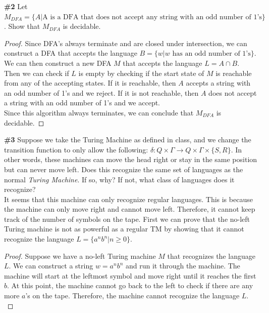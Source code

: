 \documentclass{article}
\newcommand{\problem}[1]{\textbf{\##1}}
\newcommand{\prob}[1]{\problem{#1}}
\begin{document}
\pagebreak

\prob{2} Let $M_{DFA} = \{A | \text{A is a DFA that does not accept any string with an odd number of 1's}\}$. Show that $M_{DFA}$ is decidable.

\begin{proof}
    Since DFA's always terminate and are closed under intersection, we can construct a DFA that accepts the language $B = \{w | w \text{ has an odd number of 1's}\}$. We can then construct a new DFA $M$ that accepts the language $L = A \cap B$.\\

    Then we can check if $L$ is empty by checking if the start state of $M$ is reachable from any of the accepting states. If it is reachable, then $A$ accepts a string with an odd number of 1's and we reject. If it is not reachable, then $A$ does not accept a string with an odd number of 1's and we accept.\\

    Since this algorithm always terminates, we can conclude that $M_{DFA}$ is decidable.
\end{proof}

\pagebreak

\prob{3} Suppose we take the Turing Machine as defined in class, and we change the transition function to only allow the following: $\delta : Q \times \Gamma \rightarrow Q \times \Gamma \times \{S,R\}$. In other words, these machines can move the head right or stay in the same position but can never move left. Does this recognize the same set of languages as the normal \emph{Turing Machine}. If so, why? If not, what class of languages does it recognize?\\

It seems that this machine can only recognize regular languages. This is because the machine can only move right and cannot move left. Therefore, it cannot keep track of the number of symbols on the tape. First we can prove that the no-left Turing machine is not as powerful as a regular TM by showing that it cannot recognize the language $L = \{a^n b^n | n \geq 0\}$.\\

\begin{proof}
    Suppose we have a no-left Turing machine $M$ that recognizes the language $L$. We can construct a string $w = a^n b^n$ and run it through the machine. The machine will start at the leftmost symbol and move right until it reaches the first $b$. At this point, the machine cannot go back to the left to check if there are any more $a$'s on the tape. Therefore, the machine cannot recognize the language $L$.\\
\end{proof}
\end{document}
